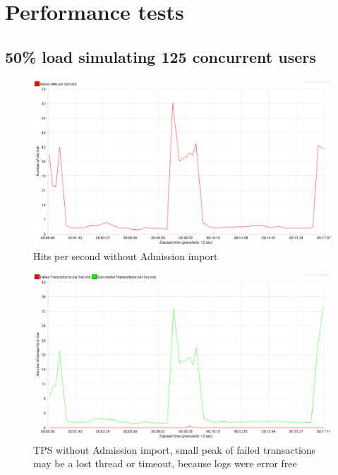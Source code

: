 \chapter{Performance tests}\label{app:performance}

	\section{50\% load simulating 125 concurrent users}	

	\begin{figure}[h]
		\label{fig:jmeter:hits_per_second_125_without_admission_import}
		\centering
		\includegraphics[width=12cm]{figures/jmeter/hits_per_second_125_without_admission_import}
		\caption{Hits per second without Admission import}
	\end{figure}
	
	\newpage

	\begin{figure}[h]
		\label{fig:jmeter:tps_125_without_admission_import}
		\centering
		\includegraphics[width=12cm]{figures/jmeter/tps_125_without_admission_import}
		\caption{TPS without Admission import, small peak of failed transactions may be a lost thread or timeout, because logs
		were error free}
	\end{figure}


